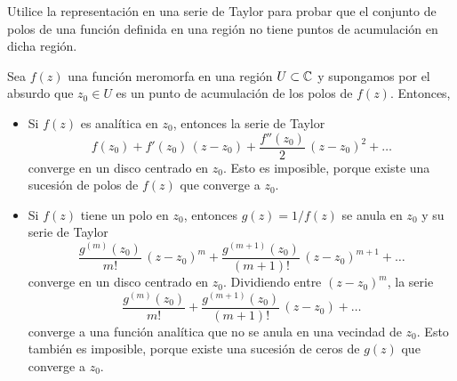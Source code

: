 \begin{exercise}
Utilice la representación en una serie de Taylor para probar que el conjunto de polos de una función definida en una región no tiene puntos de acumulación en dicha región.
\end{exercise}

\begin{solution}
Sea $f(z)$ una función meromorfa en una región $U \subset \mathbb C$ y supongamos por el absurdo que $z_0 \in U$ es un punto de acumulación de los polos de $f(z)$. Entonces,
\begin{itemize}
    \item Si $f(z)$ es analítica en $z_0$, entonces la serie de Taylor
    $$f(z_0) + f'(z_0) \, (z - z_0) + \frac {f''(z_0)} 2 \, (z - z_0)^2 + \dots$$
    converge en un disco centrado en $z_0$. Esto es imposible, porque existe una sucesión de polos de $f(z)$ que converge a $z_0$.
    
    \item Si $f(z)$ tiene un polo en $z_0$, entonces $g(z) = 1/f(z)$ se anula en $z_0$ y su serie de Taylor
    $$\frac {g^{(m)}(z_0)} {m!} \, (z - z_0)^m + \frac {g^{(m+1)}(z_0)} {(m+1)!} \, (z - z_0)^{m+1} + \dots$$
    converge en un disco centrado en $z_0$. Dividiendo entre $(z - z_0)^m$, la serie
    $$\frac {g^{(m)}(z_0)} {m!} + \frac {g^{(m+1)}(z_0)} {(m+1)!} \, (z - z_0) + \dots$$
    converge a una función analítica que no se anula en una vecindad de $z_0$. Esto también es imposible, porque existe una sucesión de ceros de $g(z)$ que converge a $z_0$.
\end{itemize}
\end{solution}
